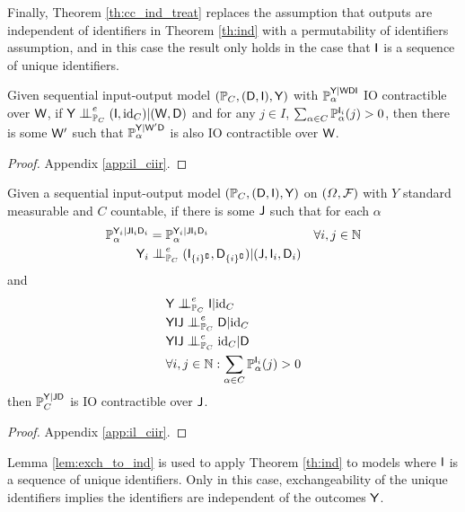 Finally, Theorem \ref{th:cc_ind_treat} replaces the assumption that outputs are independent of identifiers in Theorem \ref{th:ind} with a permutability of identifiers assumption, and in this case the result only holds in the case that $\mathsf{I}$ is a sequence of unique identifiers.

\begin{lemma}\label{lem:ind_to_cc}
Given sequential input-output model $(\mathbb{P}_C,(\mathsf{D},\mathsf{I}),\mathsf{Y})$ with $\mathbb{P}_\alpha^{\mathsf{Y}|\mathsf{WDI}}$ IO contractible over $\mathsf{W}$, if $\RV{Y}\CI_{\prob{P}_C}^e (\RV{I},\text{id}_C)|(\RV{W},\RV{D})$ and for any $j\in I$, $\sum_{\alpha\in C} \mathbb{P}_\alpha^{\mathsf{I}_i}(j)>0$, then there is some $\mathsf{W}'$ such that $\mathbb{P}_\alpha^{\mathsf{Y}|\mathsf{W}'\mathsf{D}}$ is also IO contractible over $\mathsf{W}$.
\end{lemma}

\begin{proof}
Appendix \ref{app:il_ciir}.
\end{proof}

\begin{theorem}\label{th:ind}
Given a sequential input-output model $(\mathbb{P}_C,(\mathsf{D},\mathsf{I}),\mathsf{Y})$ on $(\Omega,\mathcal{F})$ with $Y$ standard measurable and $C$ countable, if there is some $\mathsf{J}$ such that for each $\alpha$
\begin{align}
    \prob{P}_\alpha^{\RV{Y}_i|\RV{J}\RV{I}_i\RV{D}_i} &= \prob{P}_\alpha^{\RV{Y}_i|\RV{J}\RV{I}_i\RV{D}_i} &\forall i,j\in \mathbb{N}\\
    \RV{Y}_i&\CI^e_{\prob{P}_C} (\RV{I}_{\{i\}^{\complement}},\RV{D}_{\{i\}^{\complement}})|(\RV{J},\RV{I}_i,\RV{D}_i)
\end{align}
and
\begin{align}
    &\RV{Y}\CI^e_{\prob{P}_C} \RV{I} | \text{id}_C\\
    &\RV{YIJ}\CI^e_{\prob{P}_C} \RV{D}|\text{id}_C\\
    &\RV{YIJ}\CI^e_{\prob{P}_C} \text{id}_C|\RV{D}\\
    &\forall i,j\in \mathbb{N}: \sum_{\alpha\in C} \prob{P}_\alpha^{\RV{I}_i}(j)>0
\end{align}
then $\mathbb{P}_C^{\mathsf{Y}|\mathsf{JD}}$ is IO contractible over $\mathsf{J}$.
\end{theorem}

\begin{proof}
Appendix \ref{app:il_ciir}.
\end{proof}

Lemma \ref{lem:exch_to_ind} is used to apply Theorem \ref{th:ind} to models where $\mathsf{I}$ is a sequence of unique identifiers. Only in this case, exchangeability of the unique identifiers implies the identifiers are independent of the outcomes $\mathsf{Y}$.

